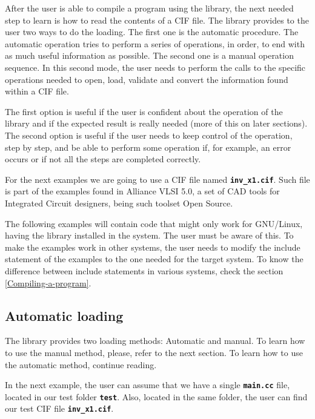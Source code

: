\documentclass[11pt,twoside,openany,x11names,svgnames]{memoir}
\begin{document}
After the user is able to compile a program using the library, the next needed step to learn is how to read the contents of a CIF file. The library provides to the user two ways to do the loading. The first one is the automatic procedure. The automatic operation tries to perform a series of operations, in order, to end with as much useful information as possible. The second one is a manual operation sequence. In this second mode, the user needs to perform the calls to the specific operations needed to open, load, validate and convert the information found within a CIF file.

The first option is useful if the user is confident about the operation of the library and if the expected result is really needed (more of this on later sections). The second option is useful if the user needs to keep control of the operation, step by step, and be able to perform some operation if, for example, an error occurs or if not all the steps are completed correctly.

For the next examples we are going to use a CIF file named \textbf{\texttt{inv\_x1.cif}}. Such file is part of the examples found in Alliance VLSI 5.0, a set of CAD tools for Integrated Circuit designers, being such toolset Open Source.

The following examples will contain code that might only work for GNU/Linux, having the library installed in the system. The user must be aware of this. To make the examples work in other systems, the user needs to modify the include statement of the examples to the one needed for the target system. To know the difference between include statements in various systems, check the section \ref{Compiling-a-program}.

\subsection{Automatic loading}\label{Automatic-loading}

The library provides two loading methods: Automatic and manual. To learn how to use the manual method, please, refer to the next section. To learn how to use the automatic method, continue reading.

In the next example, the user can assume that we have a single \textbf{\texttt{main.cc}} file, located in our test folder \textbf{\texttt{test}}. Also, located in the same folder, the user can find our test CIF file \textbf{\texttt{inv\_x1.cif}}.
\end{document}
